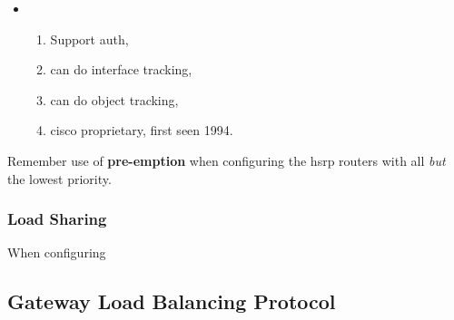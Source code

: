\begin{itemize}
\begin{enumerate}
\begin{itemize}
            \item still sending hello from time-to-time,
            \item only 1 standby router.\footnote{The nodes not being active/standby router is given the candidate role.}
        \end{itemize}
        \item \textbf{Active}
        \begin{itemize}
            \item The forwarding router for the grp Virtual \gls{mac},
            \item still sending hellos.
        \end{itemize}
    \end{enumerate}
    \item {}
    \begin{enumerate}
        \item Support auth,
        \item can do interface tracking,
        \item can do object tracking,
        \item cisco proprietary, first seen 1994.
    \end{enumerate}
\end{itemize}

Remember use of \textbf{pre-emption} when configuring the \gls{hsrp} routers with all \textit{but} the lowest priority.

\subsubsection[Blncd]{Load Sharing}

When configuring 

\newpage

\subsection[GLBP]{Gateway Load Balancing Protocol}

